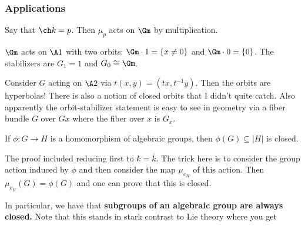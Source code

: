 \documentclass[12pt]{article}
\begin{document}
\subsubsection{Applications}
Say that $\ch k=p$. Then $\mu_p$ acts on $\Gm$ by multiplication.

\brk 

$\Gm$ acts on $\A1$ with two orbits: $\Gm\cdot 1=\{x\ne 0\}$ and $\Gm\cdot 0=\{0\}$. The stabilizers are 
$G_1=1$ and $G_0\cong\Gm$.

\brk

Consider $G$ acting on $\A2$ via $t(x,y)=(tx,t^{-1}y)$. Then the orbits are hyperbolas! There is also a notion of closed 
orbits that I didn't quite catch. Also apparently the orbit-stabilizer statement is easy to see in geometry via 
a fiber bundle $G$ over $Gx$ where the fiber over $x$ is $G_x$.

\begin{prop}
	If $\phi:G\to H$ is a homomorphism of algebraic groups, then $\phi(G)\subseteq |H|$ is closed.
\end{prop}
\begin{rmk}
	The proof included reducing first to $k=\bar k$. The trick here is to consider the group action induced by $\phi$
	and then consider the map $\mu_{e_H}$ of this action. Then $\mu_{e_H}(G)=\phi(G)$ and one can prove that this is closed.
\end{rmk}

In particular, we have that \textbf{subgroups of an algebraic group are always closed.} Note that this stands in stark contrast 
to Lie theory where you get 
\end{document}
